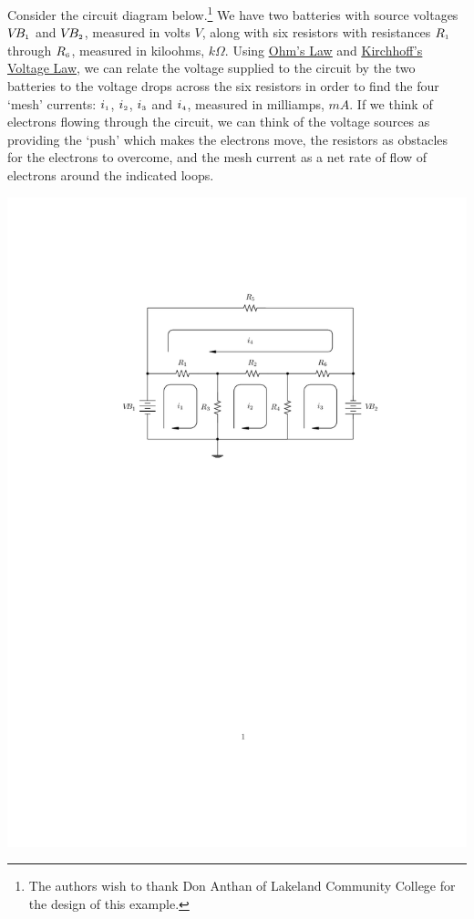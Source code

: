 \documentclass{ximera}
\begin{document}
\begin{ex} \label{circuitex} Consider the circuit diagram below.\footnote{The authors wish to thank Don Anthan of Lakeland Community College for the design of this example.}   We have two batteries with source voltages $V\!B_{\mbox{\tiny$1$}}$ and $V\!B_{\mbox{\tiny$2$}}$, measured in volts $V$, along with six resistors with resistances $R_{\mbox{\tiny$1$}}$ through $R_{\mbox{\tiny$6$}}$, measured in kiloohms, $k\Omega$.  Using \href{http://en.wikipedia.org/wiki/Ohm's_law}{\underline{Ohm's Law}}   and \href{http://en.wikipedia.org/wiki/Kirchhoff's_circuit_laws}{\underline{Kirchhoff's Voltage Law}}, we can relate the voltage supplied to the circuit by the two batteries to the voltage drops across the six resistors in order to find the four `mesh' currents: $i_{\mbox{\tiny$1$}}$, $i_{\mbox{\tiny$2$}}$, $i_{\mbox{\tiny$3$}}$ and $i_{\mbox{\tiny$4$}}$, measured in milliamps, $mA$.  If we think of electrons flowing through the circuit, we can think of the voltage sources as providing the `push' which makes the electrons move, the resistors as obstacles for the electrons to overcome, and the mesh current as a net rate of flow of electrons around the indicated loops.


\centerline{\includegraphics{./MatMethodsGraphics/CircuitDiagram01.pdf}}


\end{ex}
\end{document}
